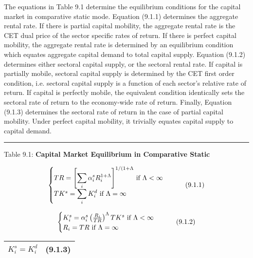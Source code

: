 \documentclass{article}
\begin{document}
The equations in Table 9.1 determine the equilibrium conditions for the capital market in comparative static mode. Equation (9.1.1) determines the aggregate rental rate. If there is partial capital mobility, the aggregate rental rate is the CET dual price of the sector specific rates of return. If there is perfect capital mobility, the aggregate rental rate is determined by an equilibrium condition which equates aggregate capital demand to total capital supply. Equation (9.1.2) determines either sectoral capital supply, or the sectoral rental rate. If capital is partially mobile, sectoral capital supply is determined by the CET first order condition, i.e. sectoral capital supply is a function of each sector's relative rate of return. If capital is perfectly mobile, the equivalent condition identically sets the sectoral rate of return to the economy-wide rate of return. Finally, Equation (9.1.3) determines the sectoral rate of return in the case of partial capital mobility. Under perfect capital mobility, it trivially equates capital supply to capital demand.

\noindent\rule{\linewidth}{0.4pt}
\begin{center}
\begin{large}
{\centering Table 9.1: \textbf{Capital Market Equilibrium in Comparative Static} \par}

\begin{equation}
    \begin{cases}
      $$TR = \left[\displaystyle \sum_i \alpha^s_i R^{1 + \Lambda}_i \right]^{1/(1+\Lambda}$$ \text{ if } $$\Lambda < \infty$$\\
      $$TK^s = \displaystyle \sum_i K^d_i$$ \text{ if } $$\Lambda = \infty$$\\
    \end{cases}       
    \tag{9.1.1}
\end{equation}

\begin{equation}
    \begin{cases}
      $$K^s_i = \alpha^s_i \left(\frac{R_i}{TR} \right)^\Lambda TK^s$$ \text{ if } $$\Lambda < \infty$$\\
      $$R_i = TR$$ \text{ if } $$\Lambda = \infty$$\\
    \end{cases}       
    \tag{9.1.2}
\end{equation}

\begin{tabular}{>{\raggedright}p{} l}

$K^s_i = K^d_i$ & \hfill (9.1.3)\\[20pt]

\hline
\end{tabular}
\end{large}
\end{center}
\end{document}
